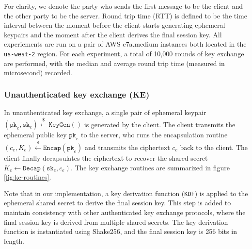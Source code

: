 \documentclass[journal=tches,submission]{iacrtrans}
\newcommand{\keygen}{\texttt{KeyGen}}
\newcommand{\encap}{\texttt{Encap}}
\newcommand{\decap}{\texttt{Decap}}
\newcommand{\pk}{\texttt{pk}}
\newcommand{\sk}{\texttt{sk}}
\newcommand{\leftsample}{\stackrel{\$}{\leftarrow}}
\begin{document}
For clarity, we denote the party who sends the first message to be the client and the other party to be the server. Round trip time (RTT) is defined to be the time interval between the moment before the client starts generating ephemeral keypairs and the moment after the client derives the final session key. All experiements are run on a pair of AWS c7a.medium instances both located in the \texttt{us-west-2} region. For each experiment, a total of 10,000 rounds of key exchange are performed, with the median and average round trip time (measured in microsecond) recorded.

\subsubsection{Unauthenticated key exchange (KE)}\label{sec:unauthenticated-key-exchange}
In unauthenticated key exchange, a single pair of ephemeral keypair $(\pk_e, \sk_e) \leftsample \keygen()$ is generated by the client. The client transmits the ephemeral public key $\pk_e$ to the server, who runs the encapsulation routine $(c_e, K_e) \leftsample \encap(\pk_e)$ and transmits the ciphertext $c_e$ back to the client. The client finally decapsulates the ciphertext to recover the shared secret $K_e \leftarrow \decap(\sk_e, c_e)$. The key exchange routines are summarized in figure \ref{fig:ke-routines}.

Note that in our implementation, a key derivation function (\texttt{KDF}) is applied to the ephemeral shared secret to derive the final session key. This step is added to maintain consistency with other authenticated key exchange protocols, where the final session key is derived from multiple shared secrets. The key derivation function is instantiated using Shake256, and the final session key is 256 bits in length.
\end{document}
